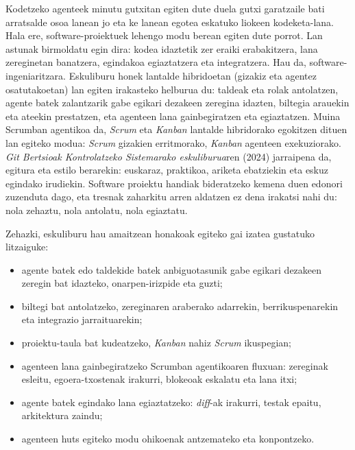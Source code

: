 Kodetzeko agenteek minutu gutxitan egiten dute duela gutxi garatzaile bati arratsalde osoa lanean jo eta ke lanean egotea eskatuko liokeen kodeketa-lana.
Hala ere, software-proiektuek lehengo modu berean egiten dute porrot.
Lan astunak birmoldatu egin dira: kodea idaztetik zer eraiki erabakitzera, lana zereginetan banatzera, egindakoa egiaztatzera eta integratzera.
Hau da, software-ingeniaritzara.
Eskuliburu honek lantalde hibridoetan (gizakiz eta agentez osatutakoetan) lan egiten irakasteko helburua du: taldeak eta rolak antolatzen, agente batek zalantzarik gabe egikari dezakeen zeregina idazten, biltegia arauekin eta ateekin prestatzen, eta agenteen lana gainbegiratzen eta egiaztatzen.
Muina Scrumban agentikoa da, \textit{Scrum} eta \textit{Kanban} lantalde hibridorako egokitzen dituen lan egiteko modua: \textit{Scrum} gizakien erritmorako, \textit{Kanban} agenteen exekuziorako.
\textit{Git Bertsioak Kontrolatzeko Sistemarako eskuliburua}ren (2024) jarraipena da, egitura eta estilo berarekin: euskaraz, praktikoa, ariketa ebatziekin eta eskuz egindako irudiekin.
Software proiektu handiak bideratzeko kemena duen edonori zuzenduta dago, eta tresnak zaharkitu arren aldatzen ez dena irakatsi nahi du: nola zehaztu, nola antolatu, nola egiaztatu.

Zehazki, eskuliburu hau amaitzean honakoak egiteko gai izatea gustatuko litzaiguke:

\begin{itemize}
    \item agente batek edo taldekide batek anbiguotasunik gabe egikari dezakeen zeregin bat idazteko, onarpen-irizpide eta guzti;
    \vspace{0.15cm}
    \item biltegi bat antolatzeko, zereginaren araberako adarrekin, berrikuspenarekin eta integrazio jarraituarekin;
    \vspace{0.15cm}
    \item proiektu-taula bat kudeatzeko, \textit{Kanban} nahiz \textit{Scrum} ikuspegian;
    \vspace{0.15cm}
    \item agenteen lana gainbegiratzeko Scrumban agentikoaren fluxuan: zereginak esleitu, egoera-txostenak irakurri, blokeoak eskalatu eta lana itxi;
    \vspace{0.15cm}
    \item agente batek egindako lana egiaztatzeko: \textit{diff}-ak irakurri, testak epaitu, arkitektura zaindu;
    \vspace{0.15cm}
    \item agenteen huts egiteko modu ohikoenak antzemateko eta konpontzeko.
\end{itemize}

